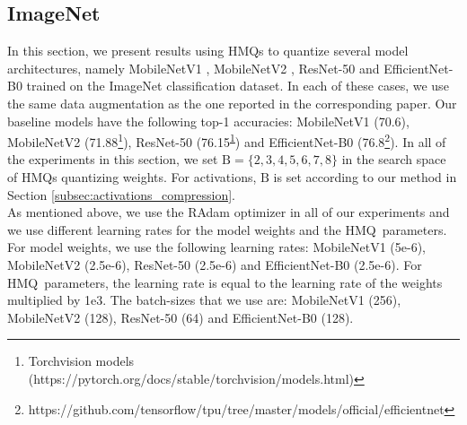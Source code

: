 \documentclass{article}
\newcommand{\bitset}{\mathrm{B}}
\newcommand{\qb}{HMQ}
\begin{document}
\subsection{ImageNet}\label{subsec:imagenet}
In this section, we present results using \qb s to quantize several model architectures, namely MobileNetV1 \cite{howard2017mobilenets}, MobileNetV2 \cite{sandler2018mobilenetv2}, ResNet-50 \cite{he2016deep} and EfficientNet-B0 \cite{tan2019efficientnet} trained on the ImageNet \cite{deng2009imagenet} classification dataset.
In each of these cases, we use the same data augmentation as the one reported in the corresponding paper.
Our baseline models have the following top-1 accuracies: MobileNetV1 (70.6), MobileNetV2 (71.88\footnote{\label{foot:torchvision}Torchvision models (https://pytorch.org/docs/stable/torchvision/models.html)}), ResNet-50 (76.15\textsuperscript{\ref{foot:torchvision}}) and EfficientNet-B0 (76.8\footnote{https://github.com/tensorflow/tpu/tree/master/models/official/efficientnet}).
In all of the experiments in this section, we set $\bitset=\{2,3,4,5,6,7,8\}$ in the search space of \qb s quantizing weights.
For activations, $\bitset$ is set according to our method in Section \ref{subsec:activations_compression}. \\


As mentioned above, we use the RAdam optimizer in all of our experiments and we use different learning rates for the model weights and the \qb\ parameters.
For model weights, we use the following learning rates: MobileNetV1 (5e-6), MobileNetV2 (2.5e-6), ResNet-50 (2.5e-6) and EfficientNet-B0 (2.5e-6). 
For \qb\ parameters, the learning rate is equal to the learning rate of the weights multiplied by 1e3. 
The batch-sizes that we use are: MobileNetV1 (256), MobileNetV2 (128), ResNet-50 (64) and EfficientNet-B0 (128).
\end{document}
